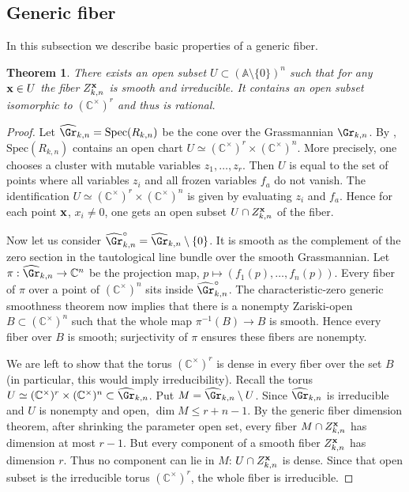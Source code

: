 \documentclass[11pt]{amsart}
\numberwithin{equation}{section}
\newtheorem{thm}{Theorem}[section]
\newcommand{\bC}{{\mathbb C}}
\newcommand{\bA}{{\mathbb A}}
\newcommand{\bfx}{{\bf x}}
\begin{document}
\subsection{Generic fiber}\label{sec:cycgenfib}
In this subsection we describe  basic properties of a generic fiber. 
\begin{thm}\label{thm:cycgen}
There exists an open subset $U\subset (\bA\setminus \{0\})^n$ such that for
any $\bfx\in U$ the fiber $Z_{k,n}^\bfx$ is smooth and irreducible. It contains 
an open subset isomorphic to $(\bC^\times)^r$ and thus is rational.
\end{thm}
\begin{proof}
Let $\widehat{\Gr}_{k,n} = \mathrm{Spec}(R_{k,n})$ be the cone over the Grassmannian $\Gr_{k,n}$.
By \cite{Sc06}, $\mathrm{Spec}(R_{k,n})$ contains an open chart  
$U\simeq (\bC^\times)^r\times (\bC^\times)^n$. More precisely, one chooses 
a cluster with mutable variables $z_1,\dots,z_r$. Then $U$ is equal to the set
of points where all variables $z_i$ and all frozen variables $f_a$ do not vanish.
The identification $U\simeq (\bC^\times)^r\times (\bC^\times)^n$ is given by 
evaluating $z_i$ and $f_a$. Hence for each point $\bfx$, $x_i\ne 0$, one gets 
an open subset $U\cap Z_{k,n}^\bfx$ of the fiber.

Now let us consider $\widehat{\Gr}^\circ_{k,n}= \widehat{\Gr}_{k,n}\setminus \{0\}$. 
It is smooth as the
complement of the zero section in the  tautological line bundle over the smooth
Grassmannian.
Let $\pi: \widehat{\Gr}_{k,n}\to \bC^n$
be the projection map, $p\mapsto (f_1(p),\dots,f_n(p))$. Every fiber of $\pi$ over a point
of $(\bC^\times)^n$ sits inside $\widehat{\Gr}_{k,n}^\circ$. 
The characteristic-zero generic smoothness theorem now implies that there is a nonempty 
Zariski-open $B\subset (\bC^\times)^n$  such that the whole map
$ \pi^{-1}(B)\to B$ is smooth. Hence every fiber over $B$ is smooth; surjectivity of 
$\pi$ ensures these fibers are nonempty. 

We are left to show that the torus $(\bC^\times)^r$ is dense in every fiber over the set $B$
(in particular, this would imply irreducibility).
Recall the torus $U\simeq (\bC^\times)^r\times (\bC^\times)^n\subset \widehat{\Gr}_{k,n}$.
Put $M = \widehat{\Gr}_{k,n}\setminus U$. Since $\widehat{\Gr}_{k,n}$ is irreducible and $U$ is nonempty and open, 
$\dim M\leq r+n-1$. By the generic fiber dimension theorem, after shrinking the parameter open 
set, every fiber $M\cap Z_{k,n}^\bfx$  has dimension at most $r-1$. But every component of 
a smooth fiber $Z_{k,n}^\bfx$ has dimension $r$. Thus no component can lie in $M$: 
$U\cap Z_{k,n}^\bfx$ is dense. Since that open subset is the irreducible torus 
$(\bC^\times)^r$, the whole fiber is irreducible.
\end{proof}
\end{document}
